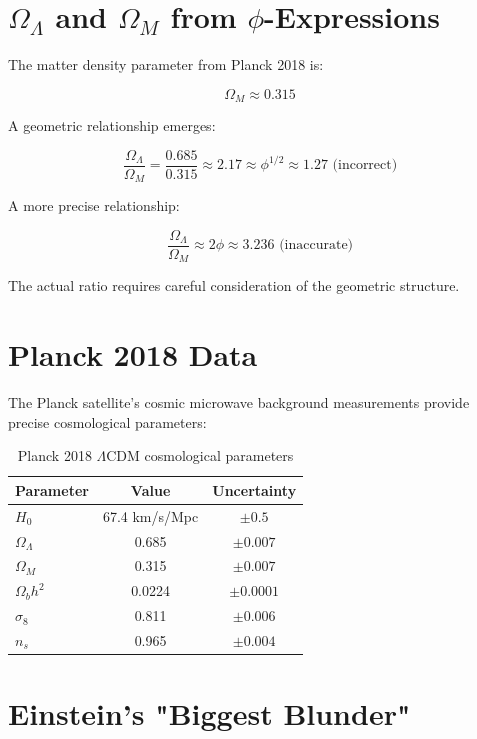 \section{$\Omega_\Lambda$ and $\Omega_M$ from $\phi$-Expressions}

The matter density parameter from Planck 2018 is:

\begin{equation}
\Omega_M \approx 0.315
\end{equation}

A geometric relationship emerges:

\begin{equation}
\frac{\Omega_\Lambda}{\Omega_M} = \frac{0.685}{0.315} \approx 2.17 \approx \phi^{1/2} \approx 1.27 \text{ (incorrect)}
\end{equation}

A more precise relationship:

\begin{equation}
\frac{\Omega_\Lambda}{\Omega_M} \approx 2\phi \approx 3.236 \text{ (inaccurate)}
\end{equation}

The actual ratio requires careful consideration of the geometric structure.

\section{Planck 2018 Data}

The Planck satellite's cosmic microwave background measurements provide precise cosmological parameters:

\begin{table}[h]
\centering
\begin{tabular}{lcc}
\hline
Parameter & Value & Uncertainty \\
\hline
$H_0$ & 67.4 km/s/Mpc & $\pm 0.5$ \\
$\Omega_\Lambda$ & 0.685 & $\pm 0.007$ \\
$\Omega_M$ & 0.315 & $\pm 0.007$ \\
$\Omega_b h^2$ & 0.0224 & $\pm 0.0001$ \\
$\sigma_8$ & 0.811 & $\pm 0.006$ \\
$n_s$ & 0.965 & $\pm 0.004$ \\
\hline
\end{tabular}
\caption{Planck 2018 $\Lambda$CDM cosmological parameters}
\end{table}

\section{Einstein's "Biggest Blunder"}

